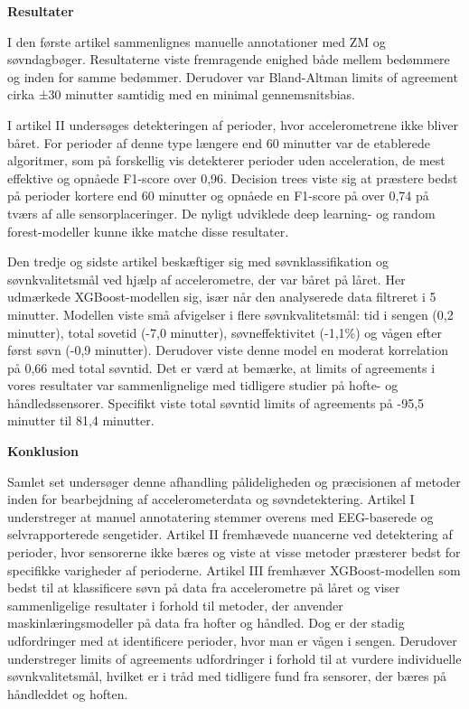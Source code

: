 \documentclass[
  9pt,
]{scrbook}
\begin{document}
\textbf{Resultater}

I den første artikel sammenlignes manuelle annotationer med ZM og
søvndagbøger. Resultaterne viste fremragende enighed både mellem
bedømmere og inden for samme bedømmer. Derudover var Bland-Altman limits
of agreement cirka ±30 minutter samtidig med en minimal gennemsnitsbias.

I artikel II undersøges detekteringen af perioder, hvor accelerometrene
ikke bliver båret. For perioder af denne type længere end 60 minutter
var de etablerede algoritmer, som på forskellig vis detekterer perioder
uden acceleration, de mest effektive og opnåede F1-score over 0,96.
Decision trees viste sig at præstere bedst på perioder kortere end 60
minutter og opnåede en F1-score på over 0,74 på tværs af alle
sensorplaceringer. De nyligt udviklede deep learning- og random
forest-modeller kunne ikke matche disse resultater.

Den tredje og sidste artikel beskæftiger sig med søvnklassifikation og
søvnkvalitetsmål ved hjælp af accelerometre, der var båret på låret. Her
udmærkede XGBoost-modellen sig, især når den analyserede data filtreret
i 5 minutter. Modellen viste små afvigelser i flere søvnkvalitetsmål:
tid i sengen (0,2 minutter), total sovetid (-7,0 minutter),
søvneffektivitet (-1,1\%) og vågen efter først søvn (-0,9 minutter).
Derudover viste denne model en moderat korrelation på 0,66 med total
søvntid. Det er værd at bemærke, at limits of agreements i vores
resultater var sammenlignelige med tidligere studier på hofte- og
håndledssensorer. Specifikt viste total søvntid limits of agreements på
-95,5 minutter til 81,4 minutter.

\textbf{Konklusion}

Samlet set undersøger denne afhandling pålideligheden og præcisionen af
metoder inden for bearbejdning af accelerometerdata og søvndetektering.
Artikel I understreger at manuel annotatering stemmer overens med
EEG-baserede og selvrapporterede sengetider. Artikel II fremhævede
nuancerne ved detektering af perioder, hvor sensorerne ikke bæres og
viste at visse metoder præsterer bedst for specifikke varigheder af
perioderne. Artikel III fremhæver XGBoost-modellen som bedst til at
klassificere søvn på data fra accelerometre på låret og viser
sammenligelige resultater i forhold til metoder, der anvender
maskinlæringsmodeller på data fra hofter og håndled. Dog er der stadig
udfordringer med at identificere perioder, hvor man er vågen i sengen.
Derudover understreger limits of agreements udfordringer i forhold til
at vurdere individuelle søvnkvalitetsmål, hvilket er i tråd med
tidligere fund fra sensorer, der bæres på håndleddet og hoften.
\end{document}
